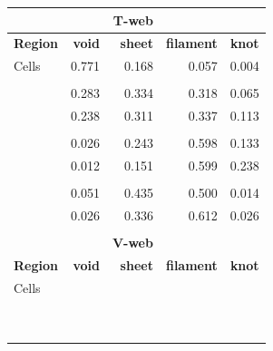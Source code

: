 \documentclass[usenatbib]{latex/mn2e}
\begin{document}
\begin{table}[H]
\begin{flushleft}
\begin{center}
  \begin{tabular}{l  r  r  r  r}
  	&&\textbf{T-web}&&\\\hline
	\textbf{Region}	&\textbf{void}&\textbf{sheet}&\textbf{filament}&\textbf{knot}	\\\hline
	Cells			&	0.771	  &		0.168	 &		0.057	   &	0.004		\\
	&&&&\\	
	\GHFOF			& 	0.283	  &		0.334	 &		0.318	   &	0.065		\\
	\GHBDM			&	0.238	  &		0.311	 &		0.337	   &	0.113		\\
	&&&&\\	
	\IPFOF			&	0.026	  &		0.243	 &		0.598	   &	0.133		\\
	\IPBDM			&	0.012	  &		0.151	 &		0.599	   &	0.238		\\
	&&&&\\
	\RIPFOF			&	0.051	  &		0.435	 &		0.500	   &	0.014		\\
	\RIPBDM			&	0.026	  &		0.336	 &		0.612	   &	0.026		\\\hline
	&&&&\\
  	&&\textbf{V-web}&&\\\hline
	\textbf{Region}	&\textbf{void}&\textbf{sheet}&\textbf{filament}&\textbf{knot}	\\\hline
	Cells			&			  &				 &				   &				\\
	&&&&\\
	\GHFOF			&			  &				 &				   &				\\
	\GHBDM			&			  &				 &				   &				\\
	&&&&\\
	\IPFOF			&			  &				 &				   &				\\
	\IPBDM			&			  &				 &				   &				\\
	&&&&\\
	\RIPFOF			&			  &				 &				   &				\\
	\RIPBDM			&			  &				 &				   &				\\\hline
  \end{tabular}  
  
  \label{Tab:Samples_Size}
  
\end{center}
\end{flushleft}
\end{table}
\end{document}
